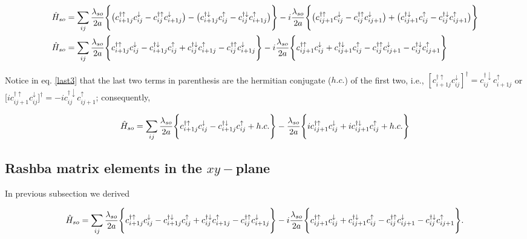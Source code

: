 \documentclass[10pt,prb,showpacs,amssymb,floatfix]{revtex4-1}
\begin{document}
\begin{align}
\hat H_{so} &= \sum_{ij} \frac{\lambda_{so}}{2a}  \Bigg{\{} \big{(} c_{i+1j}^{\dagger \uparrow} c_{ij}^\downarrow - c_{ij}^{\dagger \uparrow} c_{i+1j}^\downarrow \big{)} - \big{(} c_{i+1j}^{\dagger \downarrow} c_{ij}^\uparrow - c_{ij}^{\dagger \downarrow} c_{i+1j}^\uparrow \big{)}   \Bigg{\}}  -i\frac{\lambda_{so}}{2a} \Bigg{\{} \big{(} c_{ij+1}^{\dagger \uparrow} c_{ij}^\downarrow - c_{ij}^{\dagger \uparrow} c_{ij+1}^\downarrow\big{)} + \big{(} c_{ij+1}^{\dagger \downarrow} c_{ij}^\uparrow  - c_{ij}^{\dagger \downarrow} c_{ij+1}^\uparrow \big{)} \Bigg{\}} \\
\hat H_{so} &= \sum_{ij} \frac{\lambda_{so}}{2a}  \Bigg{\{}  c_{i+1j}^{\dagger \uparrow} c_{ij}^\downarrow -  c_{i+1j}^{\dagger \downarrow} c_{ij}^\uparrow  + c_{ij}^{\dagger \downarrow} c_{i+1j}^\uparrow - c_{ij}^{\dagger \uparrow} c_{i+1j}^\downarrow     \Bigg{\}}  -i\frac{\lambda_{so}}{2a} \Bigg{\{} c_{ij+1}^{\dagger \uparrow} c_{ij}^\downarrow +  c_{ij+1}^{\dagger \downarrow} c_{ij}^\uparrow - c_{ij}^{\dagger \uparrow} c_{ij+1}^\downarrow   - c_{ij}^{\dagger \downarrow} c_{ij+1}^\uparrow \Bigg{\}}
\label{last3}
\end{align}

Notice in eq. \eqref{last3} that the last two terms in parenthesis are the hermitian conjugate ($h.c.$) of the first two, i.e., $[c_{i+1j}^{\dagger \uparrow} c_{ij}^\downarrow ]^\dagger =  c_{ij}^{\dagger \downarrow} c_{i+1j}^{\uparrow}$ or [$ic_{ij+1}^{\dagger \uparrow} c_{ij}^\downarrow ]^\dagger = -ic_{ij}^{\dagger \downarrow}c_{ij+1}^{\uparrow}$; consequently,

\begin{align}
\hat H_{so} = \sum_{ij} \frac{\lambda_{so}}{2a}  \Bigg{\{}  c_{i+1j}^{\dagger \uparrow} c_{ij}^\downarrow -  c_{i+1j}^{\dagger \downarrow} c_{ij}^\uparrow + h.c.     \Bigg{\}}  -\frac{\lambda_{so}}{2a} \Bigg{\{} ic_{ij+1}^{\dagger \uparrow} c_{ij}^\downarrow +  ic_{ij+1}^{\dagger \downarrow} c_{ij}^\uparrow + h.c. \Bigg{\}}
\label{last4}
\end{align}


\subsection{Rashba matrix elements in the $xy-$plane}

In previous subsection we derived

\begin{align}
\hat H_{so} = \sum_{ij} \frac{\lambda_{so}}{2a}  \Bigg{\{}  c_{i+1j}^{\dagger \uparrow} c_{ij}^\downarrow -  c_{i+1j}^{\dagger \downarrow} c_{ij}^\uparrow  + c_{ij}^{\dagger \downarrow} c_{i+1j}^\uparrow - c_{ij}^{\dagger \uparrow} c_{i+1j}^\downarrow     \Bigg{\}}  -i\frac{\lambda_{so}}{2a} \Bigg{\{} c_{ij+1}^{\dagger \uparrow} c_{ij}^\downarrow +  c_{ij+1}^{\dagger \downarrow} c_{ij}^\uparrow - c_{ij}^{\dagger \uparrow} c_{ij+1}^\downarrow   - c_{ij}^{\dagger \downarrow} c_{ij+1}^\uparrow \Bigg{\}}.
\label{hso}
\end{align}
\end{document}
